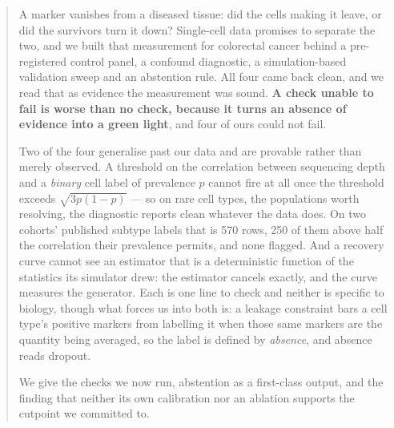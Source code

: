 \begin{abstract}
A marker vanishes from a diseased tissue: did the cells making it leave, or did
the survivors turn it down? Single-cell data promises to separate the two, and we
built that measurement for colorectal cancer behind a pre-registered control
panel, a confound diagnostic, a simulation-based validation sweep and an
abstention rule. All four came back clean, and we read that as evidence the
measurement was sound. \textbf{A check unable to fail is worse than
no check, because it turns an absence of evidence into a green light}, and four
of ours could not fail.

Two of the four generalise past our data and are provable rather than merely
observed. A threshold on the correlation between sequencing depth and a
\emph{binary} cell label of prevalence $p$ cannot fire at all once the threshold
exceeds $\sqrt{3p(1-p)}$ --- so on rare cell types, the populations worth
resolving, the diagnostic reports clean whatever the data does. On two cohorts'
published subtype labels that is 570 rows, 250 of them above half the
correlation their prevalence permits, and none flagged. And a recovery curve cannot see
an estimator that is a deterministic function of the statistics its simulator
drew: the estimator cancels exactly, and the curve measures the generator. Each
is one line to check and neither is specific to biology, though what forces us
into both is: a leakage constraint bars a cell type's positive markers from
labelling it when those same markers are the quantity being averaged, so the
label is defined by \emph{absence}, and absence reads dropout.

We give the checks we now run, abstention as a first-class output, and the
finding that neither its own calibration nor an ablation supports the cutpoint we
committed to.
\end{abstract}
